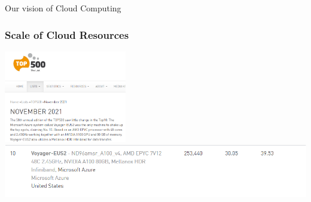 \documentclass[10pt,aspectratio=1609]{beamer}
\begin{document}
\begin{section}{Our vision of Cloud Computing}
\begin{frame}
  \frametitle{Scale of Cloud Resources}
  \centering
  \vfill
  \includegraphics[width=0.4\textwidth]{top500-1.png}
  \includegraphics[width=\textwidth]{top500-2.png}
\end{frame}




\end{section}
\end{document}
